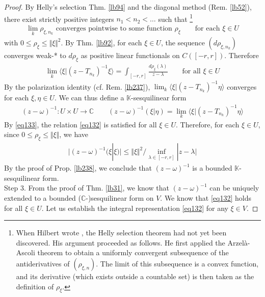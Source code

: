 \documentclass[12pt,b5paper,notitlepage]{article}
\theoremstyle{definition}
\theoremstyle{plain}
\newcommand{\bk}[1]{\langle {#1}\rangle}
\newcommand{\Kbb}{\mathbb K}
\newcommand{\Cbb}{\mathbb C}
\numberwithin{equation}{section}
\begin{document}
\begin{proof}
By Helly's selection Thm. \ref{lb94} and the diagonal method (Rem. \ref{lb52}), there exist strictly positive integers $n_1<n_2<\dots$ such that \footnote{When Hilbert wrote \cite{Hil06}, the Helly selection theorem had not yet been discovered. His argument proceeded as follows. He first applied the Arzel\`a-Ascoli theorem to obtain a uniformly convergent subsequence of the antiderivatives of $(\rho_{\xi,n})$. The limit of this subsequence is a convex function, and its derivative (which exists outside a countable set) is then taken as the definition of $\rho_\xi$.}
\begin{align*}
\lim_k \rho_{\xi,n_k}\text{ converges pointwise to some function }\rho_\xi\qquad\text{for each }\xi\in U
\end{align*}
with $0\leq\rho_\xi\leq\Vert\xi\Vert^2$. By Thm. \ref{lb92}, for each $\xi\in U$, the sequence $(d\rho_{\xi,n_k})$ converges weak-* to $d\rho_\xi$ as positive linear functionals on $C([-r,r])$. Therefore
\begin{align}\label{eq133}
\lim_k\bk{\xi|(z-T_{n_k})^{-1}\xi}=\int_{[-r,r]}\frac{d\rho_\xi(\lambda)}{z-\lambda}\qquad\text{for all }\xi\in U
\end{align}
By the polarization identity (cf. Rem. \ref{lb237}), $\lim_k\bk{\xi|(z-T_{n_k})^{-1}\eta}$ converges for each $\xi,\eta\in U$. We can thus define a $\Kbb$-sesquilinear form
\begin{align}\label{eq135}
(z-\omega)^{-1}:U\times U\rightarrow\Cbb\qquad (z-\omega)^{-1}(\xi|\eta)=\lim_k\bk{\xi|(z-T_{n_k})^{-1}\eta}
\end{align}
By \eqref{eq133}, the relation \eqref{eq132} is satisfied for all $\xi\in U$. Therefore, for each $\xi\in U$, since $0\leq\rho_\xi\leq\Vert\xi\Vert$, we have
\begin{align}\label{eq136}
\big| (z-\omega)^{-1}(\xi|\xi)\big|\leq \Vert\xi\Vert^2/\inf_{\lambda\in[-r,r]}|z-\lambda|
\end{align}
By the proof of Prop. \ref{lb238}, we conclude that $(z-\omega)^{-1}$ is a bounded $\Kbb$-sesquilinear form.\\[-1ex]


Step 3. From the proof of Thm. \ref{lb31}, we know that $(z-\omega)^{-1}$ can be uniquely extended to a bounded ($\Cbb$-)sesquilinear form on $V$. We know that \eqref{eq132} holds for all $\xi\in U$. Let us establish the integral representation \eqref{eq132} for any $\xi\in V$.


\end{proof}
\end{document}

